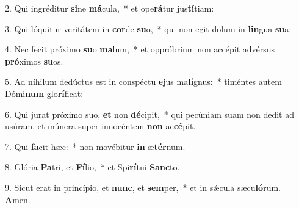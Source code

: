 2. Qui ingréditur \textbf{si}ne \textbf{má}cula,~*  et ope\textbf{rá}tur jus\textbf{tí}tiam:\

3. Qui lóquitur veritátem in \textbf{cor}de \textbf{su}o,~*  qui non egit dolum in \textbf{lin}gua \textbf{su}a:\

4. Nec fecit próximo \textbf{su}o \textbf{ma}lum,~*  et oppróbrium non accépit advérsus \textbf{pró}ximos \textbf{su}os.\

5. Ad níhilum dedúctus est in conspéctu \textbf{e}jus ma\textbf{lí}gnus:~*  timéntes autem Dómi\textbf{num} glo\textbf{rí}ficat:\

6. Qui jurat próximo suo, \textbf{et} non \textbf{dé}cipit,~*  qui pecúniam suam non dedit ad usúram, et múnera super innocéntem \textbf{non} ac\textbf{cé}pit.\

7. Qui \textbf{fa}cit hæc:~*  non movébitur \textbf{in} æ\textbf{tér}num.\

8. Glória \textbf{Pa}tri, et \textbf{Fí}lio,~*  et Spi\textbf{rí}tui \textbf{Sanc}to.\

9. Sicut erat in princípio, et \textbf{nunc}, et \textbf{sem}per,~*  et in sǽcula sæcu\textbf{ló}rum. \textbf{A}men.\

